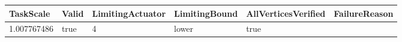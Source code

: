 \begin{tabular}{@{}llllll@{}}
\toprule
TaskScale & Valid & LimitingActuator & LimitingBound & AllVerticesVerified & FailureReason \\
\midrule
1.007767486 & true & 4 & lower & true &  \\
\bottomrule
\end{tabular}
